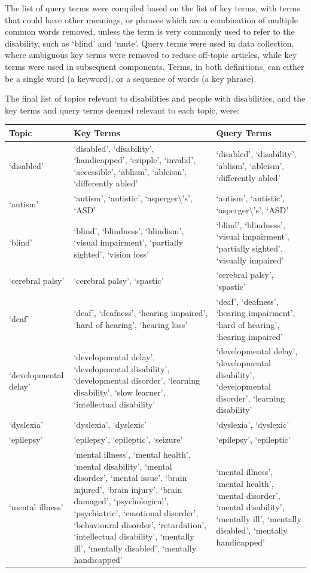 \documentclass{report}
\begin{document}
The list of query terms were compiled based on the list of key terms, with terms that could have other meanings, or phrases which are a combination of multiple common words removed, unless the term is very commonly used to refer to the disability, such as `blind' and `mute'.
Query terms were used in data collection, where ambiguous key terms were removed to reduce off-topic articles, while key terms were used in subsequent components.
Terms, in both definitions, can either be a single word (a keyword), or a sequence of words (a key phrase).

The final list of topics relevant to disabilities and people with disabilities, and the key terms and query terms deemed relevant to each topic, were: 

\begin{longtabu} to \textwidth { | X[l] | X[l] | X[l] | } 
	\hline
	Topic & Key Terms & Query Terms \\ 
	\hline
	`disabled' & `disabled', `disability', `handicapped', `cripple', `invalid', `accessible', `ablism', `ableism', `differently abled' & `disabled', `disability', `ablism', `ableism', `differently abled' \\ 
	\hline
	`autism' & `autism', `autistic', `asperger\textbackslash's', `ASD' & `autism', `autistic', `asperger\textbackslash's', `ASD' \\ 
	\hline
	`blind' & `blind', `blindness', `blindism', `visual impairment', `partially sighted', `vision loss' & `blind', `blindness', `visual impairment', `partially sighted', `visually impaired' \\ 
	\hline
	`cerebral palsy' & `cerebral palsy', `spastic' & `cerebral palsy', `spastic' \\ 
	\hline
	`deaf' & `deaf', `deafness', `hearing impaired', `hard of hearing', `hearing loss' & `deaf', `deafness', `hearing impairment', `hard of hearing', `hearing impaired' \\ 
	\hline
	`developmental delay' & `developmental delay', `developmental disability', `developmental disorder', `learning disability', `slow learner', `intellectual disability' & `developmental delay', `developmental disability', `developmental disorder', `learning disability' \\ 
	\hline
	`dyslexia' & `dyslexia', `dyslexic' & `dyslexia', `dyslexic' \\ 
	\hline
	`epilepsy' & `epilepsy', `epileptic', `seizure' & `epilepsy', `epileptic' \\ 
	\hline
	`mental illness' & `mental illness', `mental health', `mental disability', `mental disorder', `mental issue', `brain injured', `brain injury', `brain damaged', `psychological', `psychiatric', `emotional disorder', `behavioural disorder', `retardation', `intellectual disability', `mentally ill', `mentally disabled', `mentally handicapped' & `mental illness', `mental health', `mental disorder', `mental disability', `mentally ill', `mentally disabled', `mentally handicapped' \\ 

\end{longtabu}
\end{document}
